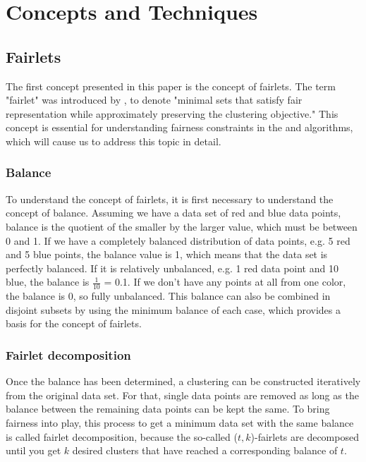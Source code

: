 \section{Concepts and Techniques}


\subsection{Fairlets}
\label{fairlets}

The first concept presented in this paper is the concept of fairlets. The term "fairlet" was introduced by  \textcite[]{Chierichetti2018}, to denote "minimal sets that satisfy fair representation
while approximately preserving the clustering objective." \autocite[1]{Chierichetti2018} This concept is essential for understanding fairness constraints in the  and  algorithms, which will cause us to address this topic in detail.

\subsubsection{Balance}

To understand the concept of fairlets, it is first necessary to understand the concept of balance. Assuming we have a data set of red and blue data points, balance is the quotient of the smaller by the larger value, which must be between 0 and 1. If we have a completely balanced distribution of data points, e.g. 5 red and 5 blue points, the balance value is 1, which means that the data set is perfectly balanced. If it is relatively unbalanced, e.g. 1 red data point and 10 blue, the balance is $\frac{1}{10}$ = 0.1. If we don't have any points at all from one color, the balance is 0, so fully unbalanced. This balance can also be combined in disjoint subsets by using the minimum balance of each case, which provides a basis for the concept of fairlets. \autocite[4]{Chierichetti2018}

\subsubsection{Fairlet decomposition}

Once the balance has been determined, a clustering can be constructed iteratively from the original data set. For that, single data points are removed as long as the balance between the remaining data points can be kept the same. To bring fairness into play, this process to get a minimum data set with the same balance is called fairlet decomposition, because the so-called ($t, k$)-fairlets are decomposed until you get $k$ desired clusters that have reached a corresponding balance of $t$. \autocite[4]{Chierichetti2018}

